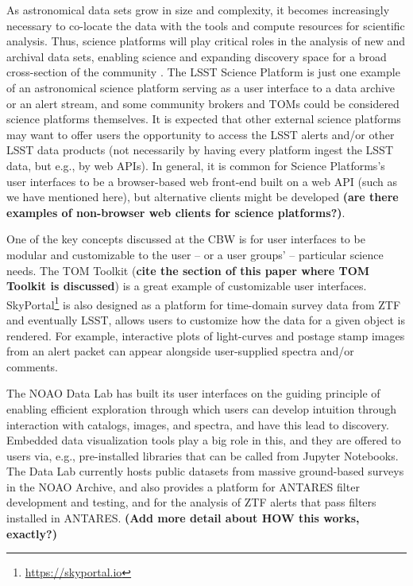 

As astronomical data sets grow in size and complexity, it becomes increasingly necessary to co-locate the data with the tools and compute resources for scientific analysis. Thus, science platforms will play critical roles in the analysis of new and archival data sets, enabling science and expanding discovery space for a broad cross-section of the community \citep[e.g.,][]{2019arXiv190305130O}. The LSST Science Platform is just one example of an astronomical science platform serving as a user interface to a data archive or an alert stream, and some community brokers and TOMs could be considered science platforms themselves. It is expected that other external science platforms may want to offer users the opportunity to access the LSST alerts and/or other LSST data products (not necessarily by having every platform ingest the LSST data, but e.g., by web APIs). In general, it is common for Science Platforms's user interfaces to be a browser-based web front-end built on a web API (such as we have mentioned here), but alternative clients might be developed {\bf (are there examples of non-browser web clients for science platforms?)}. 

One of the key concepts discussed at the CBW is for user interfaces to be modular and customizable to the user -- or a user groups' -- particular science needs. The TOM Toolkit ({\bf cite the section of this paper where TOM Toolkit is discussed}) is a great example of customizable user interfaces. SkyPortal\footnote{\url{https://skyportal.io}} \citep{skyportal2019} is also designed as a platform for time-domain survey data from ZTF and eventually LSST, allows users to customize how the data for a given object is rendered. For example, interactive plots of light-curves and postage stamp images from an alert packet can appear alongside user-supplied spectra and/or comments.

The NOAO Data Lab \citep{2019arXiv190800664O} has built its user interfaces on the guiding principle of enabling efficient exploration through which users can develop intuition through interaction with catalogs, images, and spectra, and have this lead to discovery. Embedded data visualization tools play a big role in this, and they are offered to users via, e.g., pre-installed libraries that can be called from Jupyter Notebooks. The Data Lab currently hosts public datasets from massive ground-based surveys in the NOAO Archive, and also provides a platform for ANTARES filter development and testing, and for the analysis of ZTF alerts that pass filters installed in ANTARES. {\bf (Add more detail about HOW this works, exactly?)}

